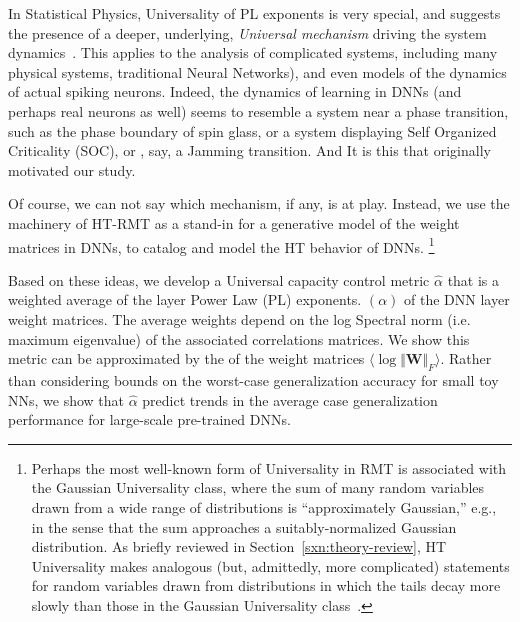 {{In Statistical Physics, Universality of PL exponents is very special, and suggests the presence of a deeper, underlying, \emph{Universal mechanism}
 driving the system dynamics~\cite{SornetteBook,BouchaudPotters03}.
 This applies to the analysis of complicated systems, including many physical systems,  traditional Neural Networks\cite{EB01_BOOK,nishimori01}),
and even models of the dynamics of actual spiking neurons.
Indeed, the dynamics of learning in DNNs (and perhaps real neurons as well) seems to resemble a system near a phase transition,
such as the phase boundary of spin glass, or a system displaying Self Organized Criticality (SOC), or , say, a Jamming transition.  
And It  is this  
 that originally motivated our study.  



Of course, we can not say which mechanism, if any, is at play.  Instead, we use the machinery of  HT-RMT 
as a stand-in for a generative model of the weight matrices in DNNs, to catalog and model the  HT behavior of DNNs.
\footnote{Perhaps the most well-known form of Universality in RMT is associated with the Gaussian Universality class, where the sum of many random variables drawn from a wide range of distributions is ``approximately Gaussian,'' e.g., in the sense that the sum approaches a suitably-normalized Gaussian distribution.  As briefly reviewed in Section~\ref{sxn:theory-review}, HT Universality makes analogous (but, admittedly, more complicated) statements for random variables drawn from distributions in which the tails decay more slowly than those in the Gaussian Universality class~\cite{MM18_TR}.}
}


Based on these ideas, we develop a Universal capacity control metric $\hat{\alpha}$ that is a weighted average of the layer Power Law (PL) exponents.
$(\alpha)$ of the DNN layer weight matrices. The average weights depend on the log Spectral norm (i.e. maximum eigenvalue) of the associated correlations matrices.
We show this metric can be approximated by the    of the weight matrices $\langle\log\Vert\mathbf{W}\Vert_F{}\rangle$.
Rather than considering bounds on the worst-case generalization accuracy for small toy NNs, we show that $\hat{\alpha}$ predict trends 
in the average case generalization performance for large-scale pre-trained DNNs.

}

